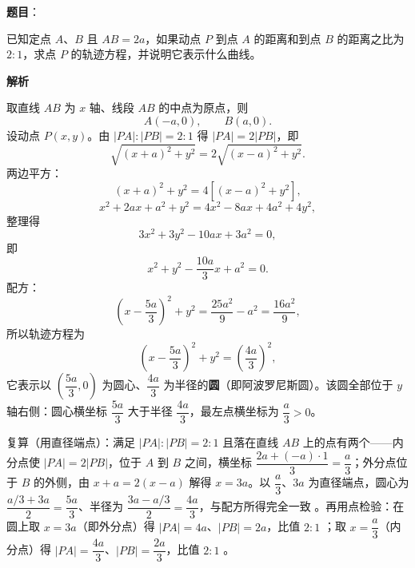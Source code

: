 \begin{answer}

\textbf{题目}：

已知定点 $A$、$B$ 且 $AB=2a$，如果动点 $P$ 到点 $A$ 的距离和到点 $B$ 的距离之比为 $2:1$，求点 $P$ 的轨迹方程，并说明它表示什么曲线。

\textbf{解析}

取直线 $AB$ 为 $x$ 轴、线段 $AB$ 的中点为原点，则
\nopagebreak[4]
\[
A(-a,0),\qquad B(a,0).
\]
设动点 $P(x,y)$。由 $\lvert PA\rvert:\lvert PB\rvert=2:1$ 得 $\lvert PA\rvert=2\lvert PB\rvert$，即
\nopagebreak[4]
\[
\sqrt{(x+a)^2+y^2}=2\sqrt{(x-a)^2+y^2}.
\]
两边平方：
\nopagebreak[4]
\[
(x+a)^2+y^2=4\left[(x-a)^2+y^2\right],
\]
\nopagebreak[4]
\[
x^2+2ax+a^2+y^2=4x^2-8ax+4a^2+4y^2,
\]
整理得
\nopagebreak[4]
\[
3x^2+3y^2-10ax+3a^2=0,
\]
即
\nopagebreak[4]
\[
x^2+y^2-\frac{10a}{3}x+a^2=0.
\]
配方：
\nopagebreak[4]
\[
\left(x-\frac{5a}{3}\right)^2+y^2=\frac{25a^2}{9}-a^2=\frac{16a^2}{9},
\]
所以轨迹方程为
\nopagebreak[4]
\[
\left(x-\frac{5a}{3}\right)^2+y^2=\left(\frac{4a}{3}\right)^2,
\]
它表示以 $\left(\dfrac{5a}{3},0\right)$ 为圆心、$\dfrac{4a}{3}$ 为半径的\textbf{圆}（即阿波罗尼斯圆）。该圆全部位于 $y$ 轴右侧：圆心横坐标 $\dfrac{5a}{3}$ 大于半径 $\dfrac{4a}{3}$，最左点横坐标为 $\dfrac a3>0$。

复算（用直径端点）：满足 $\lvert PA\rvert:\lvert PB\rvert=2:1$ 且落在直线 $AB$ 上的点有两个——内分点使 $\lvert PA\rvert=2\lvert PB\rvert$，位于 $A$ 到 $B$ 之间，横坐标 $\dfrac{2a+(-a)\cdot1}{3}=\dfrac a3$；外分点位于 $B$ 的外侧，由 $x+a=2(x-a)$ 解得 $x=3a$。以 $\dfrac a3$、$3a$ 为直径端点，圆心为 $\dfrac{a/3+3a}{2}=\dfrac{5a}{3}$、半径为 $\dfrac{3a-a/3}{2}=\dfrac{4a}{3}$，与配方所得完全一致 。再用点检验：在圆上取 $x=3a$（即外分点）得 $\lvert PA\rvert=4a$、$\lvert PB\rvert=2a$，比值 $2:1$ ；取 $x=\dfrac a3$（内分点）得 $\lvert PA\rvert=\dfrac{4a}{3}$、$\lvert PB\rvert=\dfrac{2a}{3}$，比值 $2:1$ 。


\end{answer}
